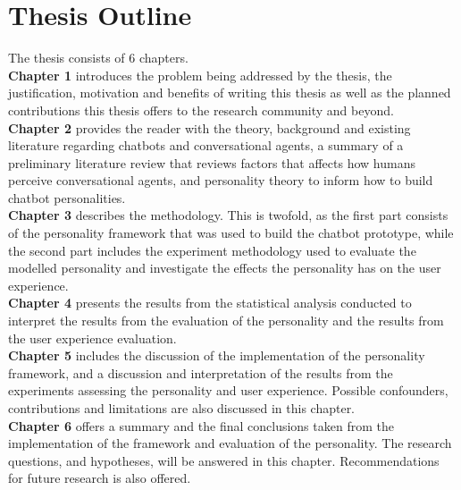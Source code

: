 \section{Thesis Outline}

The thesis consists of 6 chapters.\\

\textbf{Chapter 1} introduces the problem being addressed by the thesis, the justification, motivation and benefits of writing this thesis as well as the planned contributions this thesis offers to the research community and beyond.\\

\textbf{Chapter 2} provides the reader with the theory, background and existing literature regarding chatbots and conversational agents, a summary of a preliminary literature review that reviews factors that affects how humans perceive conversational agents, and personality theory to inform how to build chatbot personalities.\\

\textbf{Chapter 3} describes the methodology. This is twofold, as the first part consists of the personality framework that was used to build the chatbot prototype, while the second part includes the experiment methodology used to evaluate the modelled personality and investigate the effects the personality has on the user experience.\\

\textbf{Chapter 4} presents the results from the statistical analysis conducted to interpret the results from the evaluation of the personality and the results from the user experience evaluation.\\

\textbf{Chapter 5} includes the discussion of the implementation of the personality framework, and a discussion and interpretation of the results from the experiments assessing the personality and user experience. Possible confounders, contributions and limitations are also discussed in this chapter.\\

\textbf{Chapter 6} offers a summary and the final conclusions taken from the implementation of the framework and evaluation of the personality. The research questions, and hypotheses, will be answered in this chapter. Recommendations for future research is also offered.\\